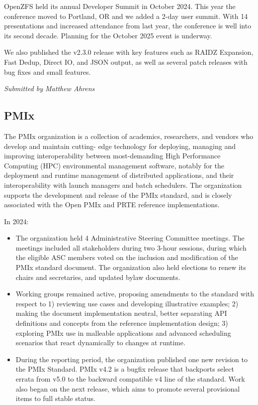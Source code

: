 \documentclass[a4paper]{report}
\begin{document}
OpenZFS held its annual Developer Summit in October 2024.  This year the conference moved to Portland, OR and we added a 2-day user summit. With 14 presentations and increased attendance from last year, the conference is well into its second decade. Planning for the October 2025 event is underway.

We also published the v2.3.0 release with key features such as RAIDZ Expansion, Fast Dedup, Direct IO, and JSON output, as well as several patch releases with bug fixes and small features.

{\em Submitted by Matthew Ahrens}

\subsection{PMIx}

The PMIx organization is a collection of academics, researchers, and vendors who develop and maintain cutting- edge technology for deploying, managing and improving interoperability between most-demanding High Performance Computing (HPC) environmental management software, notably for the deployment and runtime management of distributed applications, and their interoperability with launch managers and batch schedulers. The organization supports the development and release of the PMIx standard, and is closely associated with the Open PMIx and PRTE reference implementations.

In 2024:

\begin{itemize}

\item The organization held 4 Administrative Steering Committee meetings. The meetings included all stakeholders during two 3-hour sessions, during which the eligible ASC members voted on the inclusion and modification of the PMIx standard document. The organization also held elections to renew its chairs and secretaries, and updated bylaw documents.

\item Working groups remained active, proposing amendments to the standard with respect to 1) reviewing use cases and developing illustrative examples; 2) making the document implementation neutral, better separating API definitions and concepts from the reference implementation design; 3) exploring PMIx use in malleable applications and advanced scheduling scenarios that react dynamically to changes at runtime.

\item During the reporting period, the organization published one new revision to the PMIx Standard. PMIx v4.2 is a bugfix release that backports select errata from v5.0 to the backward compatible v4 line of the standard. Work also began on the next release, which aims to promote several provisional items to full stable status.

\end{itemize}
\end{document}
